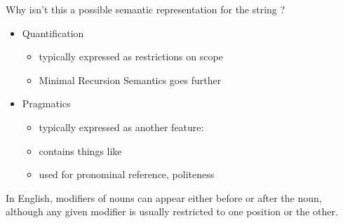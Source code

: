 \documentclass[a4paper,landscape,headrule,footrule]{foils}
\begin{document}
Why isn’t this a possible semantic representation for
the string ?

\noindent{}


\begin{itemize}
\item Quantification
  \begin{itemize}
  \item typically expressed as restrictions on scope
  \item Minimal Recursion Semantics goes further
  \end{itemize}
\item Pragmatics
  \begin{itemize}
  \item typically expressed as another feature: 
  \item contains things like 
  \item used for pronominal reference, politeness
\end{itemize}
\end{itemize}


In English, modifiers of nouns can appear either
before or after the noun, although any given modifier is usually
restricted to one position or the other.
\end{document}
